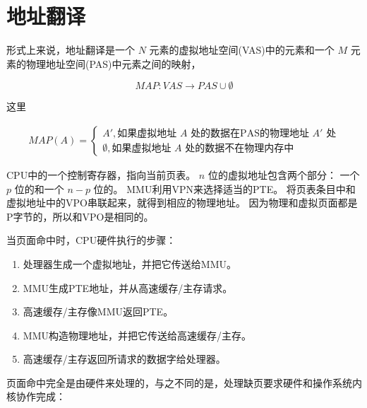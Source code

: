 
\section{地址翻译}
{
    形式上来说，地址翻译是一个 $N$ 元素的虚拟地址空间(VAS)中的元素和一个 $M$ 元素的物理地址空间(PAS)中元素之间的映射，

    $$MAP: VAS \rightarrow PAS \cup \emptyset$$

    这里

    \begin{align*}
        MAP(A) =
        \begin{cases}
            A',\text{如果虚拟地址 $A$ 处的数据在PAS的物理地址 $A'$ 处} \\
            \emptyset{}, \text{如果虚拟地址 $A$ 处的数据不在物理内存中}
        \end{cases}
    \end{align*}

    CPU中的一个控制寄存器，指向当前页表。
    $n$ 位的虚拟地址包含两个部分：
    一个 $p$ 位的和一个 $n - p$ 位的。
    MMU利用VPN来选择适当的PTE。
    将页表条目中和虚拟地址中的VPO串联起来，就得到相应的物理地址。
    因为物理和虚拟页面都是P字节的，所以和VPO是相同的。

    当页面命中时，CPU硬件执行的步骤：

    \begin{enumerate}
        \item 处理器生成一个虚拟地址，并把它传送给MMU。
        \item MMU生成PTE地址，并从高速缓存/主存请求。
        \item 高速缓存/主存像MMU返回PTE。
        \item MMU构造物理地址，并把它传送给高速缓存/主存。
        \item 高速缓存/主存返回所请求的数据字给处理器。
    \end{enumerate}

    页面命中完全是由硬件来处理的，与之不同的是，处理缺页要求硬件和操作系统内核协作完成：

}
